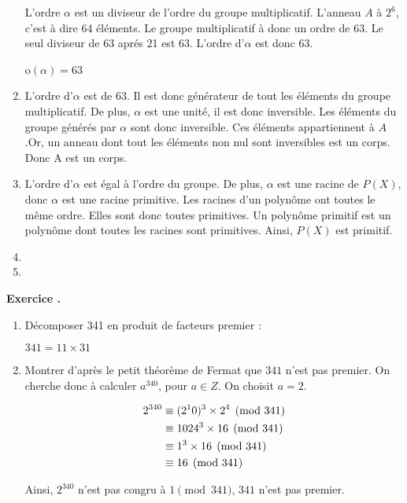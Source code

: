 \documentclass[a4paper,10pt]{article}
\newcounter{exercice}
\newcommand{\exercice}{%
		\refstepcounter{exercice}%
		\bigskip
		\bigskip
		\noindent\textbf{Exercice \theexercice.}~%
	}
\begin{document}
\begin{enumerate}
L'ordre $\alpha$ est un diviseur de l'ordre du groupe multiplicatif. L'anneau $A$ à $2^6$, c'est à dire 64 éléments. Le groupe multiplicatif à donc un ordre de 63. Le seul diviseur de 63 aprés 21 est 63. L'ordre d'$\alpha$ est donc 63.

\begin{center}
o$(\alpha)=63$
\end{center}

	\item
	L'ordre d'$\alpha$ est de 63. Il est donc générateur de tout les éléments du groupe multiplicatif. De plus, $\alpha$ est une unité, il est donc inversible. Les éléments du groupe générés par $\alpha$ sont donc inversible. Ces éléments appartiennent à $A$.Or, un anneau dont tout les éléments non nul sont inversibles est un corps. Donc A est un corps.
	\item
	L'ordre d'$\alpha$ est égal à l'ordre du groupe. De plus, $\alpha$ est une racine de $P(X)$, donc $\alpha$ est une racine primitive. Les racines d'un polynôme ont toutes le même ordre. Elles sont donc toutes primitives. Un polynôme primitif est un polynôme dont toutes les racines sont primitives. Ainsi, $P(X)$ est primitif.
	\item
	\item
	\end{enumerate}	
	\exercice
	\begin{enumerate}
	\item
	Décomposer 341 en produit de facteurs premier :
	
	$341=11 \times 31$
	\item
	Montrer d'après le petit théorème de Fermat que $341$ n'est pas  premier.
	On cherche donc à calculer $a^{340}$, pour $a \in Z$.	
	On choisit $a=2$.
	
	\begin{align}
		2^{340} &\equiv (2^10)^3 \times 2^4 \pmod{341}\notag \\
			  &\equiv 1024^3 \times 16 \pmod{341}\notag \\
			  &\equiv 1^3 \times 16 \pmod{341}\notag \\
			  &\equiv 16 \pmod{341}\notag
	\end{align}
	
	Ainsi, $2^{340}$ n'est pas congru à $1 \pmod{341}$, $341$ n'est pas premier.
	\end{enumerate}
		
	 
\end{document}
